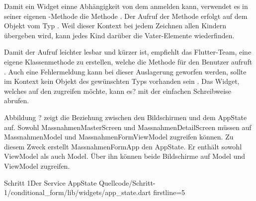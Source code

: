 Damit ein Widget einne Abhängigkeit von dem  anmelden kann, verwendet es in seiner eigenen -Methode die Methode .
Der Aufruf der Methode erfolgt auf dem Objekt vom Typ .
Weil dieser Kontext bei jedem Zeichnen allen Kindern übergeben wird, kann jedes Kind darüber die Vater-Elemente wiederfinden.

Damit der Aufruf leichter lesbar und kürzer ist, empfiehlt das Flutter-Team, eine eigene Klassenmethode zu erstellen, welche die Methode für den Benutzer aufruft .
Auch eine Fehlermeldung kann bei dieser Auslagerung geworfen werden, sollte im Kontext kein Objekt des gewünschten Typs vorhanden sein .
Das Widget, welches auf den  zugreifen möchte, kann es? mit der einfachen Schreibweise  abrufen.

Abbildung \label{lst:UmlAppState}? zeigt die Beziehung zwischen den Bildschirmen und dem AppState auf.
Sowohl MassnahmenMasterScreen und MassnahmenDetailScreen müssen auf MassnahmenModel und MassnahmenFormViewModel zugreifen können.
Zu diesem Zweck erstellt MassnahmenFormApp den AppState.
Er enthält sowohl ViewModel als auch Model.
Über ihn können beide Bildschirme auf Model und ViewModel zugreifen.



\begin{alexlisting}{Schritt 1}{Der Service AppState}
  {Quellcode/Schritt-1/conditional_form/lib/widgets/app_state.dart}
  {firstline=5}
  \label{lst:Schritt1DerServiceAppState}
\end{alexlisting}


